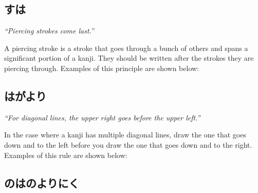 \begin{figure}[H]\label{fig:PR;漢字;書き順;横の後に縦}
	\centering
	
\end{figure}


\subsection*{すは}\label{ssec:PR;漢字;書き順;刺す画は最後}

\hspace*{24pt}\textit{``Piercing strokes come last.''}

A piercing stroke is a stroke that goes through a bunch of others and spans a significant portion of a kanji. They should be written after the strokes they are piercing through. Examples of this principle are shown below:

\begin{figure}[H]\label{fig:PR;漢字;書き順;刺す画は最後}
	\centering
	
	\hspace{0.5in}
	
\end{figure}


\subsection*{はがより}\label{ssec:PR;漢字;書き順;対角線は右上が左上より前}

\hspace*{24pt}\textit{``For diagonal lines, the upper right goes before the upper left.''}

In the case where a kanji has multiple diagonal lines, draw the one that goes down and to the left before you draw the one that goes down and to the right. Examples of this rule are shown below:

\begin{figure}[H]\label{fig:PR;漢字;書き順;対角線は右上が左上より前}
	\centering
	
	\hspace{0.5in}
	
\end{figure}


\subsection*{のはのよりにく}\label{ssec:PR;漢字;書き順;中心の縦線は右左の翼より前に書く}

